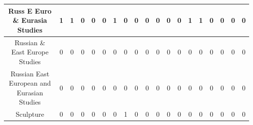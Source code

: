 \documentclass[10]{article}
\begin{document}
\begin{landscape}
\begin{longtable}[c]{|ccccccccccccccccccc|}
	\multicolumn{1}{|c|}{Russ E Euro \& Eurasia Studies}             & \multicolumn{1}{c|}{1}          & \multicolumn{1}{c|}{1}          & \multicolumn{1}{c|}{0}          & \multicolumn{1}{c|}{0}          & \multicolumn{1}{c|}{0}          & \multicolumn{1}{c|}{1}          & \multicolumn{1}{c|}{0}          & \multicolumn{1}{c|}{0}          & \multicolumn{1}{c|}{0}          & \multicolumn{1}{c|}{0}          & \multicolumn{1}{c|}{0}          & \multicolumn{1}{c|}{0}          & \multicolumn{1}{c|}{1}          & \multicolumn{1}{c|}{1}          & \multicolumn{1}{c|}{0}          & \multicolumn{1}{c|}{0}          & \multicolumn{1}{c|}{0}          & 0          \\ \hline
	\multicolumn{1}{|c|}{Russian \& East Europe Studies}             & \multicolumn{1}{c|}{0}          & \multicolumn{1}{c|}{0}          & \multicolumn{1}{c|}{0}          & \multicolumn{1}{c|}{0}          & \multicolumn{1}{c|}{0}          & \multicolumn{1}{c|}{0}          & \multicolumn{1}{c|}{0}          & \multicolumn{1}{c|}{0}          & \multicolumn{1}{c|}{0}          & \multicolumn{1}{c|}{0}          & \multicolumn{1}{c|}{0}          & \multicolumn{1}{c|}{0}          & \multicolumn{1}{c|}{0}          & \multicolumn{1}{c|}{0}          & \multicolumn{1}{c|}{0}          & \multicolumn{1}{c|}{0}          & \multicolumn{1}{c|}{0}          & 0          \\ \hline
	\multicolumn{1}{|c|}{Russian East European and Eurasian Studies} & \multicolumn{1}{c|}{0}          & \multicolumn{1}{c|}{0}          & \multicolumn{1}{c|}{0}          & \multicolumn{1}{c|}{0}          & \multicolumn{1}{c|}{0}          & \multicolumn{1}{c|}{0}          & \multicolumn{1}{c|}{0}          & \multicolumn{1}{c|}{0}          & \multicolumn{1}{c|}{0}          & \multicolumn{1}{c|}{0}          & \multicolumn{1}{c|}{0}          & \multicolumn{1}{c|}{0}          & \multicolumn{1}{c|}{0}          & \multicolumn{1}{c|}{0}          & \multicolumn{1}{c|}{0}          & \multicolumn{1}{c|}{0}          & \multicolumn{1}{c|}{0}          & 0          \\ \hline
	\multicolumn{1}{|c|}{Sculpture}                                  & \multicolumn{1}{c|}{0}          & \multicolumn{1}{c|}{0}          & \multicolumn{1}{c|}{0}          & \multicolumn{1}{c|}{0}          & \multicolumn{1}{c|}{0}          & \multicolumn{1}{c|}{0}          & \multicolumn{1}{c|}{1}          & \multicolumn{1}{c|}{0}          & \multicolumn{1}{c|}{0}          & \multicolumn{1}{c|}{0}          & \multicolumn{1}{c|}{0}          & \multicolumn{1}{c|}{0}          & \multicolumn{1}{c|}{0}          & \multicolumn{1}{c|}{0}          & \multicolumn{1}{c|}{0}          & \multicolumn{1}{c|}{0}          & \multicolumn{1}{c|}{0}          & 0          \\ \hline

\end{longtable}
\end{landscape}
\end{document}
